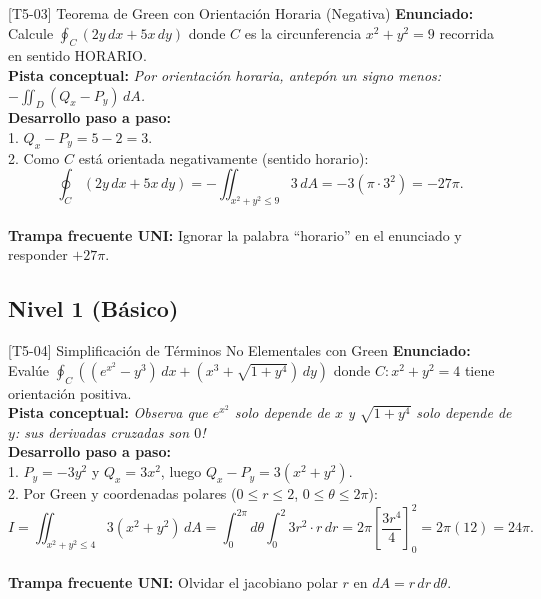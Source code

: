 \documentclass[11pt,a4paper]{article}
\begin{document}
\begin{ejerciciobox}{[T5-03] Teorema de Green con Orientación Horaria (Negativa)}
\textbf{Enunciado:} Calcule $\oint_C (2y\,dx + 5x\,dy)$ donde $C$ es la circunferencia $x^2 + y^2 = 9$ recorrida en sentido HORARIO.\\[0.2cm]
\textbf{Pista conceptual:} \emph{Por orientación horaria, antepón un signo menos: $-\iint_D (Q_x - P_y)\,dA$.}\\[0.2cm]
\textbf{Desarrollo paso a paso:}\\
1. $Q_x - P_y = 5 - 2 = 3$.\\
2. Como $C$ está orientada negativamente (sentido horario):\\
$$\oint_C (2y\,dx + 5x\,dy) = -\iint_{x^2+y^2\le 9} 3\,dA = -3(\pi \cdot 3^2) = -27\pi.$$\\[0.2cm]
\textbf{Trampa frecuente UNI:} Ignorar la palabra ``horario'' en el enunciado y responder $+27\pi$.
\end{ejerciciobox}

\subsection{Nivel 1 (Básico)}

\begin{ejerciciobox}{[T5-04] Simplificación de Términos No Elementales con Green}
\textbf{Enunciado:} Evalúe $\oint_C \left((e^{x^2} - y^3)\,dx + (x^3 + \sqrt{1 + y^4})\,dy\right)$ donde $C: x^2 + y^2 = 4$ tiene orientación positiva.\\[0.2cm]
\textbf{Pista conceptual:} \emph{Observa que $e^{x^2}$ solo depende de $x$ y $\sqrt{1+y^4}$ solo depende de $y$: sus derivadas cruzadas son $0$!}\\[0.2cm]
\textbf{Desarrollo paso a paso:}\\
1. $P_y = -3y^2$ y $Q_x = 3x^2$, luego $Q_x - P_y = 3(x^2 + y^2)$.\\
2. Por Green y coordenadas polares ($0 \le r \le 2$, $0 \le \theta \le 2\pi$):\\
$$I = \iint_{x^2+y^2\le 4} 3(x^2+y^2)\,dA = \int_0^{2\pi} d\theta \int_0^2 3r^2 \cdot r\,dr = 2\pi\left[\frac{3r^4}{4}\right]_0^2 = 2\pi(12) = 24\pi.$$\\[0.2cm]
\textbf{Trampa frecuente UNI:} Olvidar el jacobiano polar $r$ en $dA = r\,dr\,d\theta$.
\end{ejerciciobox}
\end{document}
